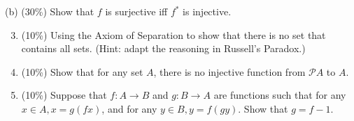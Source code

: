 \documentclass[10pt]{article}
\begin{document}
(b) (30\%) Show that $f$ is surjective iff $f^{*}$ is injective.

\begin{enumerate}
  \setcounter{enumi}{2}
  \item (10\%) Using the Axiom of Separation to show that there is no set that contains all sets. (Hint: adapt the reasoning in Russell's Paradox.)

  \item (10\%) Show that for any set $A$, there is no injective function from $\mathscr{P} A$ to $A$.

  \item (10\%) Suppose that $f: A \rightarrow B$ and $g: B \rightarrow A$ are functions such that for any $x \in A, x=g(f x)$, and for any $y \in B, y=f(g y)$. Show that $g=f-1$.

\end{enumerate}
\end{document}
